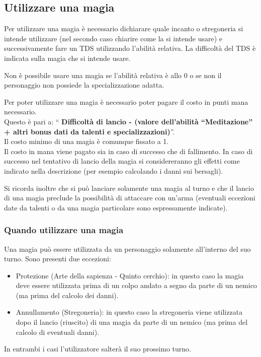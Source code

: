 \documentclass[../manuale_main.tex]{subfiles}
\begin{document}
\subsection{Utilizzare una magia}

Per utilizzare una magia è necessario dichiarare quale incanto o stregoneria si intende utilizzare (nel secondo caso chiarire come la si intende usare) e successivamente fare un TDS utilizzando l'abilità relativa. La difficoltà del TDS è indicata sulla magia che si intende usare.

Non è possibile usare una magia se l'abilità relativa è allo 0 o se non il personaggio non possiede la specializzazione adatta.

Per poter utilizzare una magia è necessario poter pagare il costo in punti mana necessario.\\
Questo è pari a: “\textbf{ Difficoltà di lancio - (valore dell'abilità “Meditazione” + altri bonus dati da talenti e specializzazioni)}”.\\
Il costo minimo di una magia è comunque fissato a 1.\\
Il costo in mana viene pagato sia in caso di successo che di fallimento.
In caso di successo nel tentativo di lancio della magia si considereranno gli effetti come indicato nella descrizione (per esempio calcolando i danni sui bersagli).

Si ricorda inoltre che si può lanciare solamente una magia al turno e che il lancio di una magia preclude la possibilità di attaccare con un'arma (eventuali eccezioni date da talenti o da una magia particolare sono espressamente indicate).

\clearpage


\subsubsection{Quando utilizzare una magia}
Una magia può essere utilizzata da un personaggio solamente all'interno del suo turno.
Sono presenti due eccezioni:
\begin{itemize}
\item Protezione (Arte della sapienza - Quinto cerchio): in questo caso la magia deve essere utilizzata prima di un colpo andato a segno da parte di un nemico (ma prima del calcolo dei danni).
\item Annullamento (Stregoneria): in questo caso la stregoneria viene utilizzata dopo il lancio (riuscito) di una magia da parte di un nemico (ma prima del calcolo di eventuali danni).
\end{itemize}
In entrambi i casi l'utilizzatore salterà il suo prossimo turno.
\end{document}
